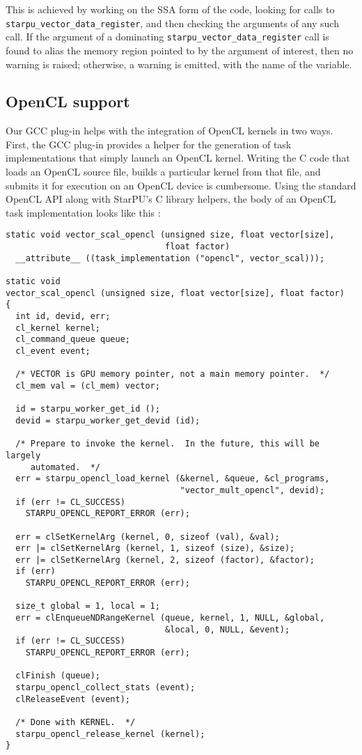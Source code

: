 \documentclass[twoside, a4paper, 10pt]{article}
\begin{document}
This is achieved by working on the SSA form of the code, looking for
calls to \texttt{starpu\_vector\_data\_register}, and then checking the arguments
of any such call.  If the argument of a dominating
\texttt{starpu\_vector\_data\_register} call is found to alias the memory region
pointed to by the argument of interest, then no warning is raised;
otherwise, a warning is emitted, with the name of the variable.
\subsection{OpenCL support}
\label{sec-3-5}


Our GCC plug-in helps with the integration of OpenCL kernels in two
ways.  First, the GCC plug-in provides a helper for the generation of task
implementations that simply launch an OpenCL kernel.  Writing the C code
that loads an OpenCL source file, builds a particular kernel from that
file, and submits it for execution on an OpenCL device is cumbersome.
Using the standard OpenCL API along with StarPU's C library helpers, the
body of an OpenCL task implementation looks like this
\cite{runtime12:starpu-handbook}:

\begin{small}

\begin{verbatim}
static void vector_scal_opencl (unsigned size, float vector[size],
                                float factor)
  __attribute__ ((task_implementation ("opencl", vector_scal)));

static void
vector_scal_opencl (unsigned size, float vector[size], float factor)
{
  int id, devid, err;
  cl_kernel kernel;
  cl_command_queue queue;
  cl_event event;

  /* VECTOR is GPU memory pointer, not a main memory pointer.  */
  cl_mem val = (cl_mem) vector;

  id = starpu_worker_get_id ();
  devid = starpu_worker_get_devid (id);

  /* Prepare to invoke the kernel.  In the future, this will be largely
     automated.  */
  err = starpu_opencl_load_kernel (&kernel, &queue, &cl_programs,
                                   "vector_mult_opencl", devid);
  if (err != CL_SUCCESS)
    STARPU_OPENCL_REPORT_ERROR (err);

  err = clSetKernelArg (kernel, 0, sizeof (val), &val);
  err |= clSetKernelArg (kernel, 1, sizeof (size), &size);
  err |= clSetKernelArg (kernel, 2, sizeof (factor), &factor);
  if (err)
    STARPU_OPENCL_REPORT_ERROR (err);

  size_t global = 1, local = 1;
  err = clEnqueueNDRangeKernel (queue, kernel, 1, NULL, &global,
                                &local, 0, NULL, &event);
  if (err != CL_SUCCESS)
    STARPU_OPENCL_REPORT_ERROR (err);

  clFinish (queue);
  starpu_opencl_collect_stats (event);
  clReleaseEvent (event);

  /* Done with KERNEL.  */
  starpu_opencl_release_kernel (kernel);
}
\end{verbatim}
\end{small}
\end{document}
